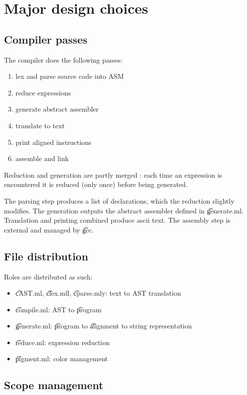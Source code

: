 \section{Major design choices}

\subsection{Compiler passes}

The compiler does the following passes:
\begin{enumerate}
    \item lex and parse source code into ASM
    \item reduce expressions
    \item generate abstract assembler
    \item translate to text
    \item print aligned instructions
    \item assemble and link
\end{enumerate}

Reduction and generation are partly merged : each time an expression is encountered it is reduced (only once) before being generated.

The parsing step produces a list of declarations, which the reduction slightly modifies. The generation outputs the abstract assembler defined in \t{generate.ml}. Translation and printing combined produce ascii text. The assembly step is external and managed by \t{gcc}.

\subsection{File distribution}

Roles are distributed as such:
\begin{itemize}
    \item \t{cAST.ml}, \t{clex.mll}, \t{cparse.mly}: text to AST translation
    \item \t{compile.ml}: AST to \t{program}
    \item \t{generate.ml}: \t{program} to \t{alignment} to string representation
    \item \t{reduce.ml}: expression reduction
    \item \t{pigment.ml}: color management
\end{itemize}

\subsection{Scope management}


